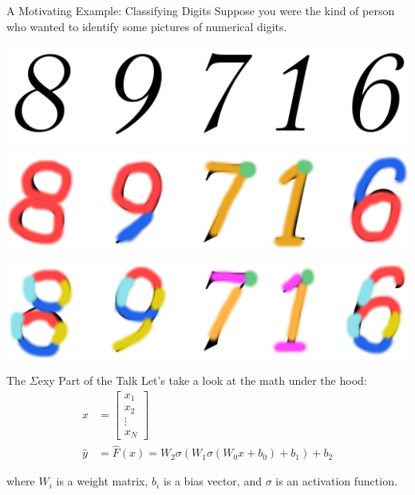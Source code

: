 \documentclass[11pt]{beamer}
\begin{document}
\begin{frame}{A Motivating Example: Classifying Digits}
Suppose you were the kind of person who wanted to identify some pictures of numerical digits.

\begin{center}

\includegraphics[scale=0.4]{digits}

\pause

\includegraphics[scale=0.4]{digits2}

\pause

\includegraphics[scale=0.4]{digits3}

\end{center}
\end{frame}

\begin{frame}{The $\Sigma$exy Part of the Talk}
Let's take a look at the math under the hood:
\begin{align*}
x &= \left[\begin{array}{c}
x_1 \\
x_2 \\
\vdots \\
x_N
\end{array}\right] \\
\widehat{y} &= \widehat{F}(x) = W_2\sigma(W_1\sigma(W_0x + b_0) + b_1) + b_2
\end{align*}

where $W_i$ is a weight matrix, $b_i $ is a bias vector, and $\sigma$ is an activation function.
\end{frame}
\end{document}
